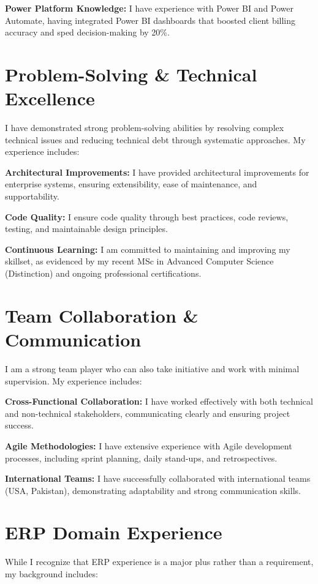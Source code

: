 \documentclass[letterpaper,10pt]{article}
\begin{document}
\textbf{Power Platform Knowledge:} I have experience with Power BI and Power Automate, having integrated Power BI dashboards that boosted client billing accuracy and sped decision-making by 20\%.

\section{Problem-Solving \& Technical Excellence}

I have demonstrated strong problem-solving abilities by resolving complex technical issues and reducing technical debt through systematic approaches. My experience includes:

\textbf{Architectural Improvements:} I have provided architectural improvements for enterprise systems, ensuring extensibility, ease of maintenance, and supportability.

\textbf{Code Quality:} I ensure code quality through best practices, code reviews, testing, and maintainable design principles.

\textbf{Continuous Learning:} I am committed to maintaining and improving my skillset, as evidenced by my recent MSc in Advanced Computer Science (Distinction) and ongoing professional certifications.

\section{Team Collaboration \& Communication}

I am a strong team player who can also take initiative and work with minimal supervision. My experience includes:

\textbf{Cross-Functional Collaboration:} I have worked effectively with both technical and non-technical stakeholders, communicating clearly and ensuring project success.

\textbf{Agile Methodologies:} I have extensive experience with Agile development processes, including sprint planning, daily stand-ups, and retrospectives.

\textbf{International Teams:} I have successfully collaborated with international teams (USA, Pakistan), demonstrating adaptability and strong communication skills.

\section{ERP Domain Experience}

While I recognize that ERP experience is a major plus rather than a requirement, my background includes:
\end{document}
